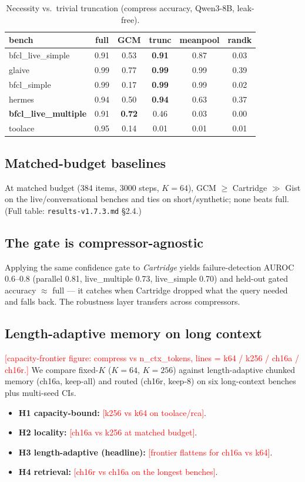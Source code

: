 \documentclass[11pt]{article}
\newcommand{\TODO}[1]{\textcolor{red}{[#1]}}
\begin{document}
\begin{table}[t]\centering\small
\caption{Necessity vs.\ trivial truncation (compress accuracy, Qwen3-8B, leak-free).}
\label{tab:trivial}
\begin{tabular}{lccccc}
\toprule
bench & full & GCM & \textbf{trunc} & meanpool & randk \\
\midrule
bfcl\_live\_simple & 0.91 & 0.53 & \textbf{0.91} & 0.87 & 0.03 \\
glaive & 0.99 & 0.77 & \textbf{0.99} & 0.99 & 0.39 \\
bfcl\_simple & 0.99 & 0.17 & \textbf{0.99} & 0.99 & 0.02 \\
hermes & 0.94 & 0.50 & \textbf{0.94} & 0.63 & 0.37 \\
\textbf{bfcl\_live\_multiple} & 0.91 & \textbf{0.72} & 0.46 & 0.03 & 0.00 \\
toolace & 0.95 & 0.14 & 0.01 & 0.01 & 0.01 \\
\bottomrule
\end{tabular}
\end{table}

\subsection{Matched-budget baselines}
At matched budget (384 items, 3000 steps, $K{=}64$), GCM $\ge$ Cartridge $\gg$ Gist on the live/conversational
benches and ties on short/synthetic; none beats full. (Full table: \texttt{results-v1.7.3.md} \S2.4.)

\subsection{The gate is compressor-agnostic}\label{sec:gate}
Applying the same confidence gate to \emph{Cartridge} yields failure-detection AUROC $0.6$--$0.8$
(parallel 0.81, live\_multiple 0.73, live\_simple 0.70) and held-out gated accuracy $\approx$ full --- it
catches when Cartridge dropped what the query needed and falls back. The robustness layer transfers across
compressors.

\subsection{Length-adaptive memory on long context}\label{sec:longctx}
\TODO{capacity-frontier figure: compress vs n\_ctx\_tokens, lines = k64 / k256 / ch16a / ch16r.}
We compare fixed-$K$ ($K{=}64$, $K{=}256$) against length-adaptive chunked memory (ch16a, keep-all) and
routed (ch16r, keep-8) on six long-context benches plus multi-seed CIs.
\begin{itemize}[noitemsep]
  \item \textbf{H1 capacity-bound:} \TODO{k256 vs k64 on toolace/rca}.
  \item \textbf{H2 locality:} \TODO{ch16a vs k256 at matched budget}.
  \item \textbf{H3 length-adaptive (headline):} \TODO{frontier flattens for ch16a vs k64}.
  \item \textbf{H4 retrieval:} \TODO{ch16r vs ch16a on the longest benches}.
\end{itemize}
\end{document}
